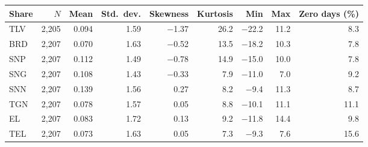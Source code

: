 \begin{tabular}{lrrrrrrrr}
\toprule
Share & $N$ & Mean & Std.\ dev. & Skewness & Kurtosis & Min & Max & Zero days (\%) \\
\midrule
TLV & 2,205 & 0.094 & 1.59 & $-$1.37 & 26.2 & $-$22.2 & 11.2 & 8.3 \\
BRD & 2,207 & 0.070 & 1.63 & $-$0.52 & 13.5 & $-$18.2 & 10.3 & 7.8 \\
SNP & 2,207 & 0.112 & 1.49 & $-$0.78 & 14.9 & $-$15.0 & 10.0 & 7.8 \\
SNG & 2,207 & 0.108 & 1.43 & $-$0.33 & 7.9 & $-$11.0 & 7.0 & 9.2 \\
SNN & 2,207 & 0.139 & 1.56 & 0.27 & 8.2 & $-$9.4 & 11.3 & 8.7 \\
TGN & 2,207 & 0.078 & 1.57 & 0.05 & 8.8 & $-$10.1 & 11.1 & 11.1 \\
EL & 2,207 & 0.083 & 1.72 & 0.13 & 9.2 & $-$11.8 & 14.4 & 9.8 \\
TEL & 2,207 & 0.073 & 1.63 & 0.05 & 7.3 & $-$9.3 & 7.6 & 15.6 \\
\bottomrule
\end{tabular}
